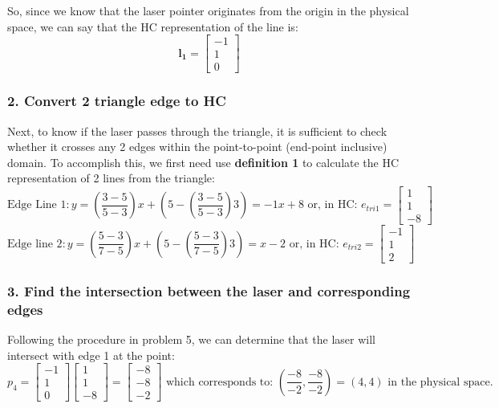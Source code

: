 \documentclass{article}
\begin{document}
So, since we know that the laser pointer originates from the origin in the physical space, we can say that the HC representation of the line is:
\[\boldsymbol{l_1} = \begin{bmatrix}
    -1 \\ 1 \\ 0
\end{bmatrix}\]


\subsubsection*{2. Convert 2 triangle edge to HC}
Next, to know if the laser passes through the triangle, it is sufficient to check whether it crosses any 2 edges within the point-to-point (end-point inclusive) domain. To accomplish this, we first need use \textbf{definition 1} to calculate the HC representation of 2 lines from the triangle:
\[\text{Edge Line 1}: y = \left(\frac{3 - 5}{5 - 3}\right) x + \left(5 - \left(\frac{3 - 5}{5 - 3}\right) 3\right) = -1x + 8 \text{ or, in HC: } e_{tri1} = \begin{bmatrix}
    1 \\ 1 \\ -8
\end{bmatrix}\]
\[\text{Edge line 2}: y = \left(\frac{5 - 3}{7 - 5}\right) x + \left(5 - \left(\frac{5 - 3}{7 - 5}\right) 3\right) = x - 2 \text{ or, in HC: } e_{tri2} = \begin{bmatrix}
    -1 \\ 1 \\ 2
\end{bmatrix}\]

\subsubsection*{3. Find the intersection between the laser and corresponding edges}
Following the procedure in problem 5, we can determine that the laser will intersect with edge 1 at the point:
\[p_4 = \begin{bmatrix}
    -1 \\ 1 \\ 0
\end{bmatrix} \begin{bmatrix}
    1 \\ 1 \\ -8
\end{bmatrix} = \begin{bmatrix}
    -8 \\ -8 \\ -2
\end{bmatrix} \text{ which corresponds to: } \left(\frac{-8}{-2}, \frac{-8}{-2}\right) = (4,4) \text{ in the physical space.}\]
\end{document}
